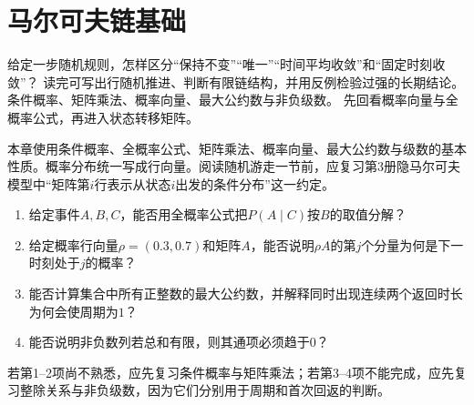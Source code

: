 \chapter{马尔可夫链基础}\label{chap:V5-C01}

{给定一步随机规则，怎样区分“保持不变”“唯一”“时间平均收敛”和“固定时刻收敛”？}
{读完可写出行随机推进、判断有限链结构，并用反例检验过强的长期结论。}
{条件概率、矩阵乘法、概率向量、最大公约数与非负级数。}
{先回看概率向量与全概率公式，再进入状态转移矩阵。}
\label{struct:V5-C01-CH01}

\label{struct:V5-C01-CH02}
\begin{prerequisitebox}
本章使用条件概率、全概率公式、矩阵乘法、概率向量、最大公约数与级数的基本性质。概率分布统一写成行向量。阅读随机游走一节前，应复习第3册隐马尔可夫模型中“矩阵第$i$行表示从状态$i$出发的条件分布”这一约定。
\end{prerequisitebox}

\label{struct:V5-C01-CH03}
\begin{precheckbox}
\begin{enumerate}[leftmargin=2.2em]
  \item 给定事件$A,B,C$，能否用全概率公式把$P(A\mid C)$按$B$的取值分解？
  \item 给定概率行向量$\rho=(0.3,0.7)$和矩阵$A$，能否说明$\rho A$的第$j$个分量为何是下一时刻处于$j$的概率？
  \item 能否计算集合中所有正整数的最大公约数，并解释同时出现连续两个返回时长为何会使周期为$1$？
  \item 能否说明非负数列若总和有限，则其通项必须趋于$0$？
\end{enumerate}
若第1--2项尚不熟悉，应先复习条件概率与矩阵乘法；若第3--4项不能完成，应先复习整除关系与非负级数，因为它们分别用于周期和首次回返的判断。
\end{precheckbox}

